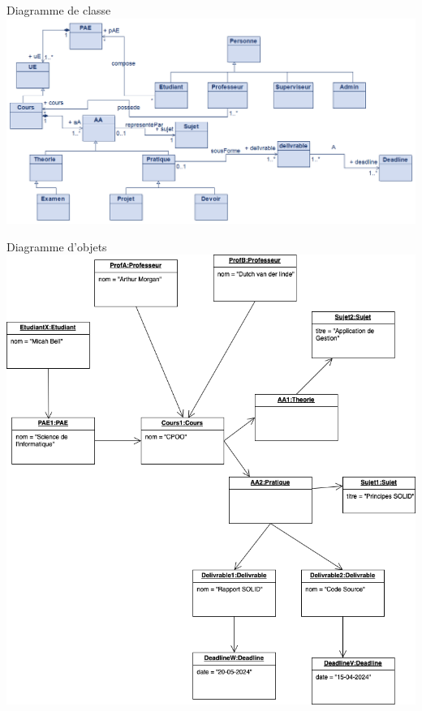 \documentclass[numbering=fraction]{beamer}
\begin{document}
\begin{frame}{Diagramme de classe}
    \includegraphics[]{Images/classe.png}
\end{frame}

\begin{frame}{Diagramme d'objets}
     \includegraphics[]{Images/objet.png}
\end{frame}
\end{document}
